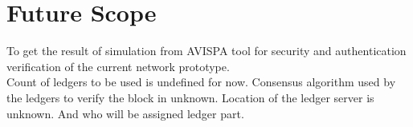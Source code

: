 \chapter{Future Scope}

{
    To get the result of simulation from AVISPA tool for 
    security and authentication verification of the current
    network prototype.\\

    
    Count of ledgers to be used is undefined for now.
    Consensus algorithm used by the ledgers to verify the block in unknown.
    Location of the ledger server is unknown. And who will be assigned
    ledger part.
}


